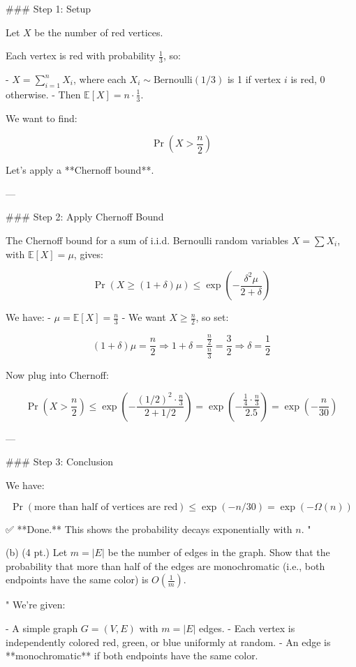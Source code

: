 ### Step 1: Setup

Let \( X \) be the number of red vertices.

Each vertex is red with probability \( \frac{1}{3} \), so:

- \( X = \sum_{i=1}^n X_i \), where each \( X_i \sim \text{Bernoulli}(1/3) \) is 1 if vertex \( i \) is red, 0 otherwise.
- Then \( \mathbb{E}[X] = n \cdot \frac{1}{3} \).

We want to find:

\[
\Pr\left(X > \frac{n}{2}\right)
\]

Let's apply a **Chernoff bound**.

---

### Step 2: Apply Chernoff Bound

The Chernoff bound for a sum of i.i.d. Bernoulli random variables \( X = \sum X_i \), with \( \mathbb{E}[X] = \mu \), gives:

\[
\Pr(X \ge (1 + \delta)\mu) \le \exp\left(-\frac{\delta^2 \mu}{2 + \delta}\right)
\]

We have:
- \( \mu = \mathbb{E}[X] = \frac{n}{3} \)
- We want \( X \ge \frac{n}{2} \), so set:

\[
(1 + \delta)\mu = \frac{n}{2} \Rightarrow 1 + \delta = \frac{\frac{n}{2}}{\frac{n}{3}} = \frac{3}{2} \Rightarrow \delta = \frac{1}{2}
\]

Now plug into Chernoff:

\[
\Pr\left(X > \frac{n}{2}\right) \le \exp\left(-\frac{(1/2)^2 \cdot \frac{n}{3}}{2 + 1/2}\right)
= \exp\left(-\frac{\frac{1}{4} \cdot \frac{n}{3}}{2.5}\right)
= \exp\left(-\frac{n}{30}\right)
\]

---

### Step 3: Conclusion

We have:

\[
\Pr(\text{more than half of vertices are red}) \le \exp(-n/30) = \exp(-\Omega(n))
\]

✅ **Done.** This shows the probability decays exponentially with \( n \).
"

(b) (4 pt.) Let $m = |E|$ be the number of edges in the graph. Show that the probability that more than half of the edges are monochromatic (i.e., both endpoints have the same color) is $O(\frac{1}{m})$.

"
We're given:

- A simple graph \( G = (V, E) \) with \( m = |E| \) edges.
- Each vertex is independently colored red, green, or blue uniformly at random.
- An edge is **monochromatic** if both endpoints have the same color.

